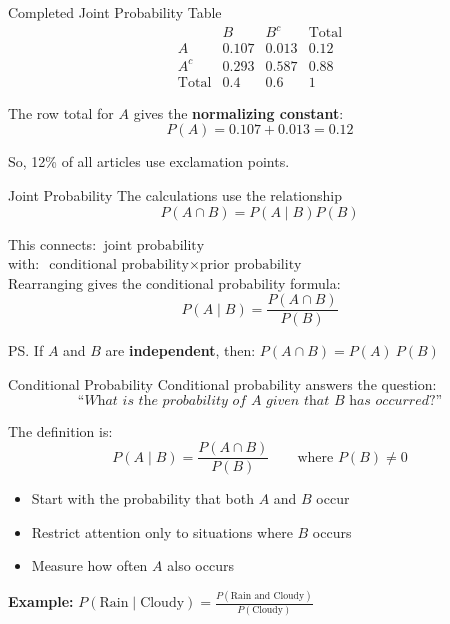 \documentclass[12pt]{beamer}
\begin{document}
\begin{frame}{}
\begin{block}{Completed Joint Probability Table}
\[
\begin{array}{c|ccc}
 & B & B^c & \text{Total} \\
\hline
A   & 0.107 & 0.013 & 0.12 \\
A^c & 0.293 & 0.587 & 0.88 \\
\hline
\text{Total} & 0.4 & 0.6 & 1
\end{array}
\]

The row total for \(A\) gives the \textbf{normalizing constant}:
\[
P(A) = 0.107 + 0.013 = \boxed{0.12}
\]

So, 12\% of all articles use exclamation points.
\end{block}
\end{frame}

\begin{frame}{}
\begin{block}{Joint Probability}
The calculations use the relationship
\[
P(A \cap B)=P(A\mid B)P(B)
\]

This connects: $~ \text{joint probability}$\\

with: $~ \text{conditional probability} \times \text{prior probability}$\\

Rearranging gives the conditional probability formula:
\[
P(A\mid B)=\frac{P(A \cap B)}{P(B)}
\]

\textcolor{aggiemaroon!70}{
PS. If \(A\) and \(B\) are \textbf{independent}, then:
$P(A \cap B) = P(A) ~ P(B)$
}
\end{block}
\end{frame}

\begin{frame}{}
\begin{block}{Conditional Probability}
Conditional probability answers the question:
\[
\textit{“What is the probability of } A \textit{ given that } B \textit{ has occurred?”}
\]

The definition is:
\[
P(A \mid B) = \frac{P(A \cap B)}{P(B)}
\qquad \text{where } P(B) \neq 0
\]

\begin{itemize}
    \item Start with the probability that both \(A\) and \(B\) occur
    \item Restrict attention only to situations where \(B\) occurs
    \item Measure how often \(A\) also occurs
\end{itemize}
\vspace{0.4cm}

\textcolor{aggiemaroon!70}{
\textbf{Example:}
$
P(\text{Rain} \mid \text{Cloudy})
=
\frac{
P(\text{Rain and Cloudy})
}{
P(\text{Cloudy})
}
$
}
\end{block}
\end{frame}
\end{document}
